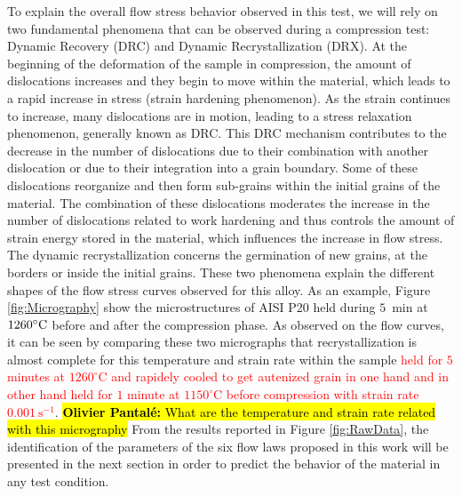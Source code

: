 \documentclass[twoside,english,1p,final,sort&compress]{elsarticle}
\theoremstyle{plain}
\DeclareRobustCommand{\OP}[1]{ {\begingroup\sethlcolor{VWyellow}\textcolor{red}{\hl{\textbf{Olivier Pantal\'e:} #1}}\endgroup} }
\begin{document}
To explain the overall flow stress behavior observed in this test, we will rely on two fundamental phenomena that can be observed during a compression test: Dynamic Recovery (DRC) and Dynamic Recrystallization (DRX).
At the beginning of the deformation of the sample in compression, the amount of dislocations increases and they begin to move within the material, which leads to a rapid increase in stress (strain hardening phenomenon).
As the strain continues to increase, many dislocations are in motion, leading to a stress relaxation phenomenon, generally known as DRC.
This DRC mechanism contributes to the decrease in the number of dislocations due to their combination with another dislocation or due to their integration into a grain boundary.
Some of these dislocations reorganize and then form sub-grains within the initial grains of the material.
The combination of these dislocations moderates the increase in the number of dislocations related to work hardening and thus controls the amount of strain energy stored in the material, which influences the increase in flow stress.
The dynamic recrystallization concerns the germination of new grains, at the borders or inside the initial grains.
These two phenomena explain the different shapes of the flow stress curves observed for this alloy.
As an example, Figure \ref{fig:Micrography} show the microstructures of AISI P20 held during $5$~min at $1260\celsius$ before and after the compression phase.
As observed on the flow curves, it can be seen by comparing these two micrographs that recrystallization is almost complete for this temperature and strain rate within the sample \textcolor{red}{held for $5$ minutes at $1260^\circ$C and rapidely cooled to get autenized grain in one hand and in other hand held for $1$ minute at $1150^\circ$C before compression with strain rate $0.001\ \text{s}^{-1}$}.
\OP{What are the temperature and strain rate related with this micrography}
From the results reported in Figure \ref{fig:RawData}, the identification of the parameters of the six flow laws proposed in this work will be presented in the next section in order to predict the behavior of the material in any test condition.
\end{document}
